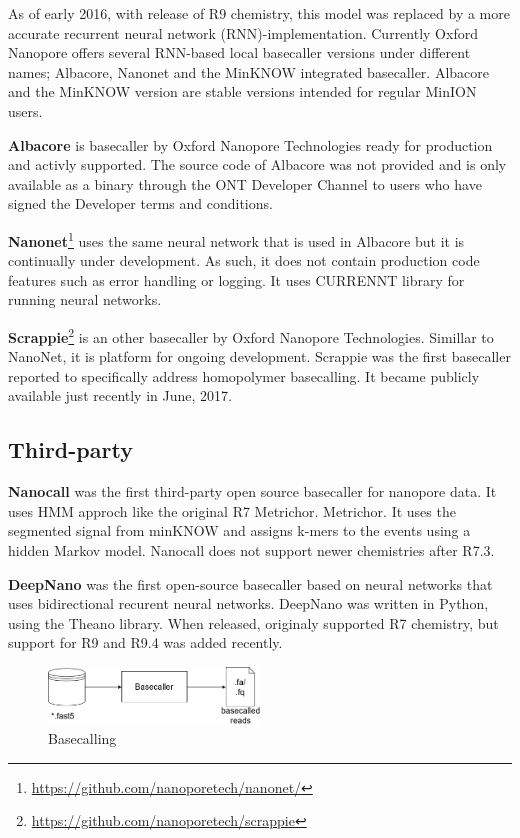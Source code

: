 \documentclass[times, utf8, diplomski, numeric, english]{fer}
\begin{document}
As of early 2016, with release of R9 chemistry, this model was replaced by a more accurate recurrent neural network (RNN)-implementation. Currently Oxford Nanopore offers several RNN-based local basecaller versions under different names; Albacore, Nanonet and the MinKNOW integrated basecaller. Albacore and the MinKNOW version are stable versions intended for regular MinION users.

\textbf{Albacore} is basecaller by Oxford Nanopore Technologies ready for production and activly supported.
The source code of Albacore was not provided and is only available as a binary through the ONT Developer Channel to users who have signed the Developer terms and conditions. 

\textbf{Nanonet}\footnote{\url{https://github.com/nanoporetech/nanonet/}} uses the same neural network that is used in Albacore but it is continually under development. As such, it does not contain production code features such as error handling or logging. It uses CURRENNT library for running neural networks.


\textbf{Scrappie}\footnote{\url{https://github.com/nanoporetech/scrappie}} is an other basecaller by Oxford Nanopore Technologies. Simillar to NanoNet, it is platform for ongoing development. Scrappie was the first basecaller reported to specifically address homopolymer basecalling. It became publicly available just recently in June, 2017.

\subsection{Third-party}



\textbf{Nanocall}\cite{David046086} was the first third-party open source basecaller for nanopore data. It uses HMM approch like the original R7 Metrichor. Metrichor. It uses the segmented signal from minKNOW and assigns k-mers to the events using a hidden Markov model. Nanocall does not support newer chemistries after R7.3.
 

\textbf{DeepNano}\cite{Boza2017}  was the first open-source basecaller based on neural networks that uses bidirectional recurent neural networks. DeepNano was written in Python, using the Theano library. When released, originaly supported R7 chemistry, but support for R9 and R9.4 was added recently.


\begin{figure}[!ht]
	\begin{center}
		\includegraphics[width=0.5\textwidth]{./imgs/basecalling.png}
		\caption{Basecalling}
		\label{fg:basecalling}
	\end{center}
\end{figure}
\end{document}
